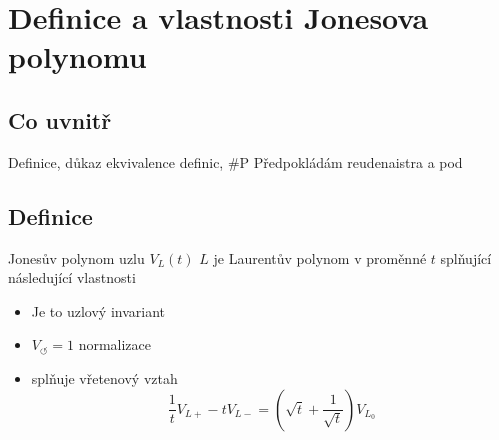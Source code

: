 
\chapter{Definice a vlastnosti Jonesova polynomu}

\section{Co uvnitř}

Definice, důkaz ekvivalence definic, \#P 
Předpokládám reudenaistra a pod

\section{Definice}

\begin{definice}\label{def01:1}
Jonesův polynom uzlu $V_L(t)$ $L$ je Laurentův polynom v proměnné $t$ splňující následující vlastnosti
\begin{itemize}

\item 
Je to uzlový invariant
\item 
 $V_\circlearrowleft = 1$ normalizace 
\item  
splňuje vřetenový vztah 
$$ \frac{1}{t} V_{L+} - t V_{L-} = (\sqrt{t}  + \frac{1}{\sqrt{t}}) V_{L_0}$$
\end{itemize}
\end{definice}